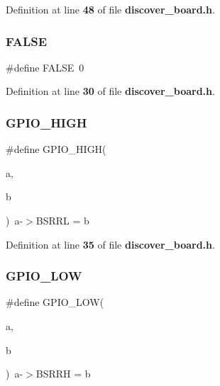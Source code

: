 Definition at line \textbf{ 48} of file \textbf{ discover\+\_\+board.\+h}.

\mbox{\label{discover__board_8h_aa93f0eb578d23995850d61f7d61c55c1}} 
\subsubsection{F\+A\+L\+SE}
{\footnotesize\ttfamily \#define F\+A\+L\+SE~0}



Definition at line \textbf{ 30} of file \textbf{ discover\+\_\+board.\+h}.

\mbox{\label{discover__board_8h_aac6c34b251ae71bdccf5c2a3ee29864c}} 
\subsubsection{G\+P\+I\+O\+\_\+\+H\+I\+GH}
{\footnotesize\ttfamily \#define G\+P\+I\+O\+\_\+\+H\+I\+GH(\begin{DoxyParamCaption}\item[{}]{a,  }\item[{}]{b }\end{DoxyParamCaption})~a-\/$>$B\+S\+R\+RL = b}



Definition at line \textbf{ 35} of file \textbf{ discover\+\_\+board.\+h}.

\mbox{\label{discover__board_8h_a4e02403c2b1482d1844ed27c03806af0}} 
\subsubsection{G\+P\+I\+O\+\_\+\+L\+OW}
{\footnotesize\ttfamily \#define G\+P\+I\+O\+\_\+\+L\+OW(\begin{DoxyParamCaption}\item[{}]{a,  }\item[{}]{b }\end{DoxyParamCaption})~a-\/$>$B\+S\+R\+RH = b}




